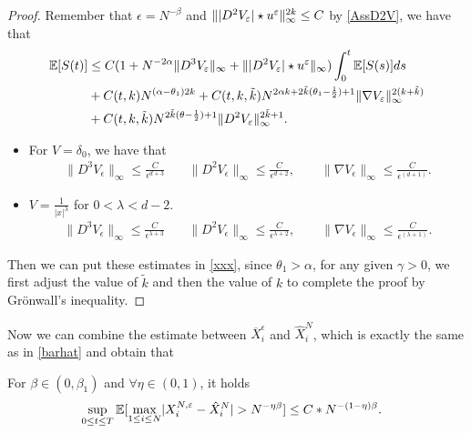 \begin{proof}
Remember that $\epsilon = N^{-\beta } $ and $\|\lvert D^2 V_\varepsilon\rvert \star  u^{\varepsilon}  \|_{\infty}^{2k} \le C $ by \autoref{AssD2V}, we have that
\begin{align} \label{xxx}
\mathbb{E}[S(t)] &\le  C(1 + N^{-2 \alpha  } \|D^{3}V_\varepsilon \|_{\infty}   + \||D^2 V_{\varepsilon}| \star  u^{\varepsilon} \|_{\infty} ) \int_0^{t} \mathbb{E}[S(s)] ds\\
&+ C(t,k)N^{(\alpha  - \theta_1)2k} +  C(t,k,\tilde k)N^{2 \alpha  k + 2 \tilde{k}(\theta_1 - \frac{1}{2}) + 1 } \|\nabla V_{\varepsilon}\|_{\infty}^{2(k+\tilde{k} )} \\
&+ C(t,k,\tilde k)N^{2 \tilde{k}(\theta  - \frac{1}{2}) + 1 } \|D^2V_{\varepsilon}\|_{\infty}^{2\tilde{k}+1}  
.\end{align}

\begin{itemize}
	\item For $V=\delta_0$, we have that 
	\begin{align*}
	\|D^3 V_{\epsilon}\|_{\infty} \le  \frac{C}{\epsilon^{d+3}}\quad &\|D^2 V_{\epsilon}\|_{\infty} \le  \frac{C}{\epsilon^{d+2}},\qquad\|\nabla V_{\epsilon}\|_{\infty} \le  \frac{C}{\epsilon ^{(d+1)} }
	.\end{align*}
	\item $V=\frac{1}{|x|^\lambda}$ for $0<\lambda<d-2$. 	\begin{align*}
	\|D^3 V_{\epsilon}\|_{\infty} \le  \frac{C}{\epsilon^{\lambda+3}}\quad &\|D^2 V_{\epsilon}\|_{\infty} \le  \frac{C}{\epsilon^{\lambda+2}},\qquad\|\nabla V_{\epsilon}\|_{\infty} \le  \frac{C}{\epsilon ^{(\lambda+1)} }
	.\end{align*}
\end{itemize}
Then we can put these estimates in \autoref{xxx}, since $\theta_1>\alpha$, for any given $\gamma>0$, we first adjust the value of $\tilde k$ and then the value of $k$ to complete the proof by Grönwall's inequality.
\end{proof}
Now we can combine the estimate between $\overline{X}_i^{\epsilon}$ and $\hat{X}_i^{N}$, which is exactly the same as in \autoref{barhat} and obtain that
\begin{corollary} \label{eta} For $\beta\in (0,\beta_1)$ and $\forall\eta\in (0,1)$, it holds
 \begin{align*}
&\sup_{0\leq t\leq T}   \mathbb{E}[\max_{1\leq i\leq N} \lvert X_{i}^{N,\varepsilon} - \hat{X}_i^{N} \rvert > N^{-\eta\beta}]\leq C*N^{-(1-\eta)\beta} 
.\end{align*}
\end{corollary}

